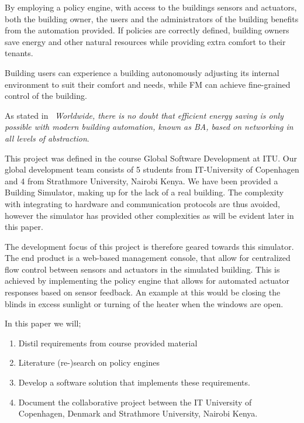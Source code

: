 
By employing a policy engine, with access to the buildings sensors and actuators, both the building owner, the users and the administrators of the building benefits from the automation provided. If policies are correctly defined, building owners save energy and other natural resources while providing extra comfort to their tenants. 

Building users can experience a building autonomously adjusting its internal environment to suit their comfort and needs, while FM can achieve fine-grained control of the building.

As stated in~\cite{ba-short} \textit{Worldwide, there is no doubt that efficient energy saving is only possible with modern building automation, known as BA, based on networking in all levels of abstraction}.

This project was defined in the course Global Software Development at ITU. Our global development team consists of 5 students from IT-University of Copenhagen and 4 from Strathmore University, Nairobi Kenya. We have been provided a Building Simulator, making up for the lack of a real building. The complexity with integrating to hardware and communication protocols are thus avoided, however the simulator has provided other complexities as will be evident later in this paper. 

The development focus of this project is therefore geared towards this simulator. The end product is a web-based management console, that allow for centralized flow control between sensors and actuators in the simulated building. This is achieved by implementing the policy engine that allows for automated actuator responses based on sensor feedback. An example at this would be closing the blinds in excess sunlight or turning of the heater when the windows are open.

In this paper we will; 
\begin{enumerate}
	\item Distil requirements from course provided material 
	\item Literature (re-)search on policy engines
	\item Develop a software solution that implements these requirements.
	\item Document the collaborative project between the IT University of Copenhagen, Denmark and Strathmore University, Nairobi Kenya.
\end{enumerate}

